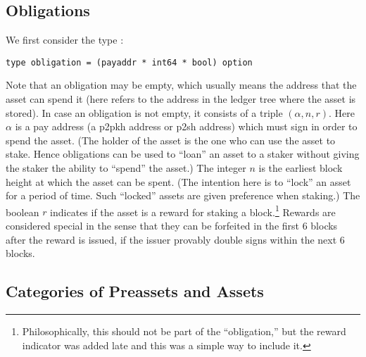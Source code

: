 \subsection{Obligations}

We first consider the type {}:
\begin{verbatim}
type obligation = (payaddr * int64 * bool) option
\end{verbatim}
Note that an
obligation may be empty, which usually means the address that {}
the asset can spend it (here {} refers to the address in the ledger
tree where the asset is stored).
In case an obligation is not empty, it consists of a triple $(\alpha,n,r)$.
Here $\alpha$ is a pay address (a p2pkh address or p2sh address) which must
sign in order to spend the asset.
(The holder of the asset is the one who can use the asset to stake.
Hence obligations can be used to ``loan'' an asset to a staker
without giving the staker the ability to ``spend'' the asset.)
The integer $n$ is the earliest block height at which the asset can be spent.
(The intention here is to ``lock'' an asset for a period of time. Such ``locked''
assets are given preference when staking.)
The boolean $r$ indicates if the asset is a reward for staking a block.\footnote{Philosophically, this should not be part of the ``obligation,'' but the reward indicator was added late and this was a simple way to include it.}
Rewards are considered special in the sense that they can be forfeited in the first 6 blocks
after the reward is issued, if the issuer provably double signs within the next 6 blocks.

\subsection{Categories of Preassets and Assets}

